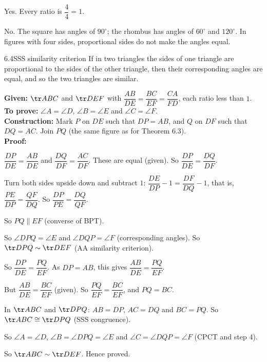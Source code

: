 \begin{solvefirst}
\begin{solution}
\begin{steps}
  \item[(a)] Yes. Every ratio is $\dfrac44=1$.
  \item[(b)] No. The square has angles of $90^\circ$; the rhombus has angles of $60^\circ$ and $120^\circ$. In figures with four sides, proportional sides do not make the angles equal.
\end{steps}
\end{solution}
\end{solvefirst}

\begin{theorem}{6.4}{SSS similarity criterion}
If in two triangles the sides of one triangle are proportional to the sides of the other triangle, then their corresponding angles are equal, and so the two triangles are similar.
\end{theorem}

\textbf{Given:} $\tr ABC$ and $\tr DEF$ with $\dfrac{AB}{DE}=\dfrac{BC}{EF}=\dfrac{CA}{FD}$, each ratio less than $1$.\\
\textbf{To prove:} $\angle A=\angle D$, $\angle B=\angle E$ and $\angle C=\angle F$.\\
\textbf{Construction:} Mark $P$ on $DE$ such that $DP=AB$, and $Q$ on $DF$ such that $DQ=AC$. Join $PQ$ (the same figure as for Theorem 6.3).\\
\textbf{Proof:}
\begin{steps}
  \item $\dfrac{DP}{DE}=\dfrac{AB}{DE}$ and $\dfrac{DQ}{DF}=\dfrac{AC}{DF}$. These are equal (given). So $\dfrac{DP}{DE}=\dfrac{DQ}{DF}$.
  \item Turn both sides upside down and subtract $1$: $\dfrac{DE}{DP}-1=\dfrac{DF}{DQ}-1$, that is, $\dfrac{PE}{DP}=\dfrac{QF}{DQ}$. So $\dfrac{DP}{PE}=\dfrac{DQ}{QF}$.
  \item So $PQ\parallel EF$ (converse of BPT).
  \item So $\angle DPQ=\angle E$ and $\angle DQP=\angle F$ (corresponding angles). So $\tr DPQ\sim\tr DEF$ (AA similarity criterion).
  \item So $\dfrac{DP}{DE}=\dfrac{PQ}{EF}$. As $DP=AB$, this gives $\dfrac{AB}{DE}=\dfrac{PQ}{EF}$.
  \item But $\dfrac{AB}{DE}=\dfrac{BC}{EF}$ (given). So $\dfrac{PQ}{EF}=\dfrac{BC}{EF}$, and $PQ=BC$.
  \item In $\tr ABC$ and $\tr DPQ$: $AB=DP$, $AC=DQ$ and $BC=PQ$. So $\tr ABC\cong\tr DPQ$ (SSS congruence).
  \item So $\angle A=\angle D$, $\angle B=\angle DPQ=\angle E$ and $\angle C=\angle DQP=\angle F$ (CPCT and step 4).
\end{steps}
So $\tr ABC\sim\tr DEF$. \hfill Hence proved.

